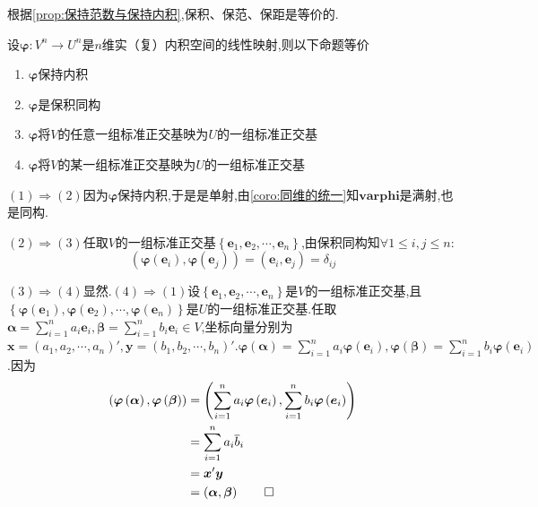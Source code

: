 \begin{red}
    \begin{remark}
        根据\cref{prop:保持范数与保持内积},保积、保范、保距是等价的.
    \end{remark}
\end{red}
\begin{formal}
    \begin{proposition}[保持内积的等价结论]\label{prop:保持内积的等价结论}
        设$\bm{\varphi}:V^n\longrightarrow U^n$是$n$维实（复）内积空间的线性映射,则以下命题等价\begin{enumerate}[label={\textup{(\arabic*)}}]
            \item $\bm{\varphi}$保持内积
            \item $\bm{\varphi}$是保积同构
            \item $\bm{\varphi}$将$V$的任意一组标准正交基映为$U$的一组标准正交基
            \item $\bm{\varphi}$将$V$的某一组标准正交基映为$U$的一组标准正交基
        \end{enumerate}
    \end{proposition}
    \begin{Proof}
        $(1)\Longrightarrow(2)$因为$\bm{\varphi}$保持内积,于是是单射,由\cref{coro:同维的统一}知$\bm{varphi}$是满射,也是同构.

        $(2)\Longrightarrow(3)$任取$V$的一组标准正交基$\left\{
            \bm{e}_1,\bm{e}_2,\cdots,\bm{e}_n
        \right\}$,由保积同构知$\forall1\leqslant i,j\leqslant n:$\[
        \left(
            \bm{\varphi}\left(\bm{e}_i\right),\bm{\varphi}\left(\bm{e}_j\right)
        \right)=\left(
            \bm{e}_i,\bm{e}_j
        \right)=\delta_{ij}
        \]

        $(3)\Longrightarrow(4)$显然.$(4)\Longrightarrow(1)$设$\left\{
            \bm{e}_1,\bm{e}_2,\cdots,\bm{e}_n
        \right\}$是$V$的一组标准正交基,且$\left\{
            \bm{\varphi}\left(\bm{e}_1\right),\bm{\varphi}\left(\bm{e}_2\right),\cdots,\bm{\varphi}\left(\bm{e}_n\right)
        \right\}$是$U$的一组标准正交基.任取$\displaystyle\bm{\alpha}=\sum_{i=1}^{n}a_i\bm{e}_i,\bm{\beta}=\sum_{i=1}^{n}b_i\bm{e}_i\in V$,坐标向量分别为$\displaystyle\bm{x}=\left(
            a_1,a_2,\cdots,a_n
        \right)',\bm{y}=\left(
            b_1,b_2,\cdots,b_n
        \right)'.\bm{\varphi}\left(\bm{\alpha}\right)=\sum_{i=1}^{n}a_i\bm{\varphi}\left(\bm{e}_i\right),\bm{\varphi}\left(\bm{\beta}\right)=\sum_{i=1}^{n}b_i\bm{\varphi}\left(\bm{e}_i\right)$.因为\begin{align*}
            \left(
                \bm{\varphi}\left(\bm{\alpha}\right),\bm{\varphi}\left(\bm{\beta}\right)
            \right)&=\left(
                \sum_{i=1}^{n}a_i\bm{\varphi}\left(\bm{e}_i\right),\sum_{i=1}^{n}b_i\bm{\varphi}\left(\bm{e}_i\right)
            \right)\\
            &=\sum_{i=1}^{n}a_i\overline{b}_i\\
            &=\bm{x}'\bm{y}\\
            &=\left(
                \bm{\alpha},\bm{\beta}
            \right)\qedhere
        \end{align*}
        \end{Proof}
\end{formal}
